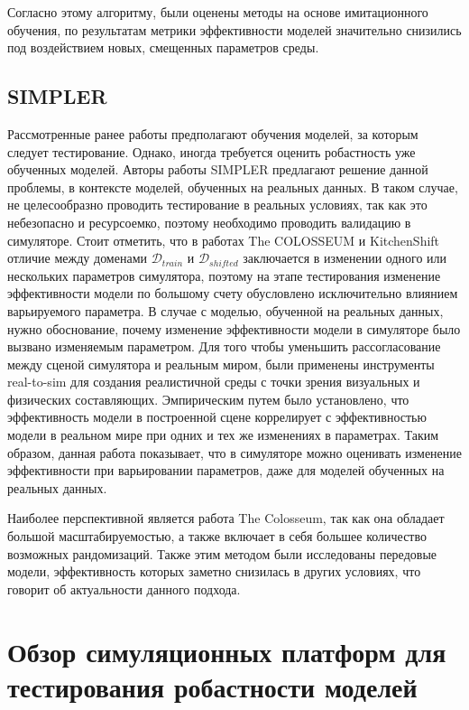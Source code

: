     Согласно этому алгоритму, были оценены методы на основе имитационного обучения, по результатам метрики эффективности моделей значительно снизились под воздействием новых, смещенных параметров среды.

    \subsection{SIMPLER}

        Рассмотренные ранее работы предполагают обучения моделей, за которым следует тестирование. Однако, иногда требуется оценить робастность уже обученных моделей.
        Авторы работы SIMPLER \cite{li24simpler} предлагают решение данной проблемы, в контексте моделей, обученных на реальных данных. В таком случае, не целесообразно проводить тестирование в реальных условиях, так как это небезопасно и ресурсоемко, поэтому необходимо проводить валидацию в симуляторе. Стоит отметить, что в работах The COLOSSEUM и KitchenShift отличие между доменами $\mathcal{D}_{train}$ и $\mathcal{D}_{shifted}$ заключается в изменении одного или нескольких параметров симулятора, поэтому на этапе тестирования изменение эффективности модели по большому счету обусловлено исключительно влиянием варьируемого параметра. В случае с моделью, обученной на реальных данных, нужно обоснование, почему изменение эффективности модели в симуляторе было вызвано изменяемым параметром. Для того чтобы уменьшить рассогласование между сценой симулятора и реальным миром, были применены инструменты real-to-sim для создания реалистичной среды с точки зрения визуальных и физических составляющих. Эмпирическим путем было установлено, что эффективность модели в построенной сцене коррелирует с эффективностью модели в реальном мире при одних и тех же изменениях в параметрах. Таким образом, данная работа показывает, что в симуляторе можно оценивать изменение эффективности при варьировании параметров, даже для моделей обученных на реальных данных. 

    Наиболее перспективной является работа The Colosseum, так как она обладает большой масштабируемостью, а также включает в себя большее количество возможных рандомизаций. Также этим методом были исследованы передовые модели, эффективность которых заметно снизилась в других условиях, что говорит об актуальности данного подхода.
    
\section{Обзор симуляционных платформ для тестирования робастности моделей}

